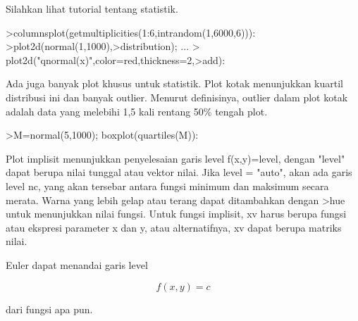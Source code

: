 \documentclass[a4paper,10pt]{article}
\begin{document}
\begin{eulernotebook}
\begin{eulercomment}
\begin{eulercomment}
\begin{eulercomment}
\begin{eulercomment}
\begin{eulercomment}
\begin{eulercomment}
\begin{eulercomment}
\begin{eulercomment}
\begin{eulercomment}
\begin{eulercomment}
\begin{eulercomment}
Silahkan lihat tutorial tentang statistik.
\end{eulercomment}
\begin{eulerprompt}
>columnsplot(getmultiplicities(1:6,intrandom(1,6000,6))):
>plot2d(normal(1,1000),>distribution); ...
>  plot2d("qnormal(x)",color=red,thickness=2,>add):
\end{eulerprompt}
\begin{eulercomment}
Ada juga banyak plot khusus untuk statistik. Plot kotak menunjukkan
kuartil distribusi ini dan banyak outlier. Menurut definisinya,
outlier dalam plot kotak adalah data yang melebihi 1,5 kali rentang
50\% tengah plot.
\end{eulercomment}
\begin{eulerprompt}
>M=normal(5,1000); boxplot(quartiles(M)):
\end{eulerprompt}
\begin{eulercomment}
Plot implisit menunjukkan penyelesaian garis level f(x,y)=level,
dengan "level" dapat berupa nilai tunggal atau vektor nilai. Jika
level = "auto", akan ada garis level nc, yang akan tersebar antara
fungsi minimum dan maksimum secara merata. Warna yang lebih gelap atau
terang dapat ditambahkan dengan \textgreater{}hue untuk menunjukkan nilai fungsi.
Untuk fungsi implisit, xv harus berupa fungsi atau ekspresi parameter
x dan y, atau alternatifnya, xv dapat berupa matriks nilai.

Euler dapat menandai garis level

\end{eulercomment}
\begin{eulerformula}
\[
f(x,y) = c
\]
\end{eulerformula}
\begin{eulercomment}
dari fungsi apa pun.


\end{eulercomment}
\end{eulercomment}
\end{eulercomment}
\end{eulercomment}
\end{eulercomment}
\end{eulercomment}
\end{eulercomment}
\end{eulercomment}
\end{eulercomment}
\end{eulercomment}
\end{eulercomment}
\end{eulernotebook}
\end{document}
